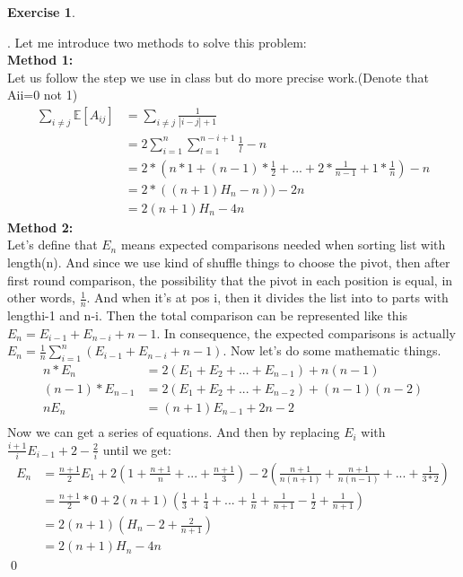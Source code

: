 \documentclass[12pt, notitlepage]{article}
\newtheorem{ex}{Exercise}
\newenvironment{sol}
  {\par\vspace{3mm}\noindent{\it Solution}.}{\qed}
\begin{document}
\begin{ex}\end{ex}
\begin{sol}
Let me introduce two methods to solve this problem:\\
\textbf{Method 1:}\\
Let us follow the step we use in class but do more precise work.(Denote that Aii=0 not 1)
\begin{align*}
\sum_{i\neq j}^{}\mathbb{E}[A_{ij}]&=\sum_{i\neq j}^{}\frac{1}{|i-j|+1}\\
&=2\sum_{i=1}^{n}\sum_{l=1}^{n-i+1}\frac{1}{l}-n\\
&=2*(n*1+(n-1)*\frac{1}{2}+...+2*\frac{1}{n-1}+1*\frac{1}{n})-n\\
&=2*((n+1)H_n-n))-2n\\
&=2(n+1)H_n-4n
\end{align*}
\textbf{Method 2:}\\
Let's define that $E_n$ means expected comparisons needed when sorting list with length(n). And since we use kind of shuffle things to choose the pivot, then after  first round comparison, the possibility that the pivot in each position is equal, in other words, $\frac{1}{n}$. And when it's at pos i, then it divides the list into to parts with length{i-1} and {n-i}. Then the total comparison can be represented like this $E_n = E_{i-1}+E_{n-i}+n-1$. In consequence, the expected comparisons is actually $E_n=\frac{1}{n}\sum_{i=1}^{n}(E_{i-1}+E_{n-i}+n-1)$. Now let's do some mathematic things.
\begin{align*}
n*E_n&=2(E_1+E_2+...+E_{n-1})+n(n-1) \tag{1}\\
(n-1)*E_{n-1}&=2(E_1+E_2+...+E_{n-2})+(n-1)(n-2) \tag{2}\\
nE_n&=(n+1)E_{n-1}+2n-2 \tag{(1)-(2)}\\
\end{align*}
Now we can get a series of equations. And then by replacing $E_i$ with $\frac{i+1}{i}E_{i-1}+2-\frac{2}{i}$ until we get:
\begin{align*}
E_n&=\frac{n+1}{2}E_{1}+2(1+\frac{n+1}{n}+...+\frac{n+1}{3})-2(\frac{n+1}{n(n+1)}+\frac{n+1}{n(n-1)}+...+\frac{1}{3*2})\\
&=\frac{n+1}{2}*0+2(n+1)(\frac{1}{3}+\frac{1}{4}+...+\frac{1}{n}+\frac{1}{n+1}-\frac{1}{2}+\frac{1}{n+1})\\
&=2(n+1)(H_n-2+\frac{2}{n+1})\\
&=2(n+1)H_n-4n
\end{align*}
\end{sol}
\end{document}
